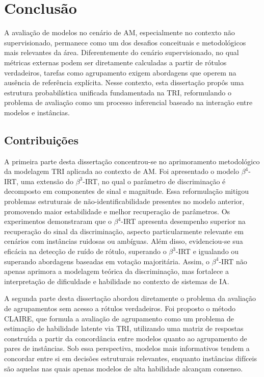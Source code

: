 \chapter{Conclusão}\label{chap:n5_conclusao}

A avaliação de modelos no cenário de \gls{AM}, especialmente no contexto não supervisionado, permanece como um dos desafios conceituais e metodológicos mais relevantes da área. Diferentemente do cenário supervisionado, no qual métricas externas podem ser diretamente calculadas a partir de rótulos verdadeiros, tarefas como agrupamento exigem abordagens que operem na ausência de referência explícita. Nesse contexto, esta dissertação propôs uma estrutura probabilística unificada fundamentada na \gls{TRI}, reformulando o problema de avaliação como um processo inferencial baseado na interação entre modelos e instâncias.

\section{Contribuições}

A primeira parte desta dissertação concentrou-se no aprimoramento metodológico da modelagem \gls{TRI} aplicada ao contexto de \gls{AM}. Foi apresentado o modelo $\beta^{4}$-\gls{IRT}, uma extensão do $\beta^{3}$-\gls{IRT}, no qual o parâmetro de discriminação é decomposto em componentes de sinal e magnitude. Essa reformulação mitigou problemas estruturais de não-identificabilidade presentes no modelo anterior, promovendo maior estabilidade e melhor recuperação de parâmetros. Os experimentos demonstraram que o $\beta^{4}$-\gls{IRT} apresenta desempenho superior na recuperação do sinal da discriminação, aspecto particularmente relevante em cenários com instâncias ruidosas ou ambíguas. Além disso, evidenciou-se sua eficácia na detecção de ruído de rótulo, superando o $\beta^{3}$-\gls{IRT} e igualando ou superando abordagens baseadas em votação majoritária. Assim, o $\beta^{4}$-\gls{IRT} não apenas aprimora a modelagem teórica da discriminação, mas fortalece a interpretação de dificuldade e habilidade no contexto de sistemas de \gls{IA}.

A segunda parte desta dissertação abordou diretamente o problema da avaliação de agrupamentos sem acesso a rótulos verdadeiros. Foi proposto o método CLAIRE, que formula a avaliação de agrupamento como um problema de estimação de habilidade latente via TRI, utilizando uma matriz de respostas construída a partir da concordância entre modelos quanto ao agrupamento de pares de instâncias. Sob essa perspectiva, modelos mais informativos tendem a concordar entre si em decisões estruturais relevantes, enquanto instâncias difíceis são aquelas nas quais apenas modelos de alta habilidade alcançam consenso.

